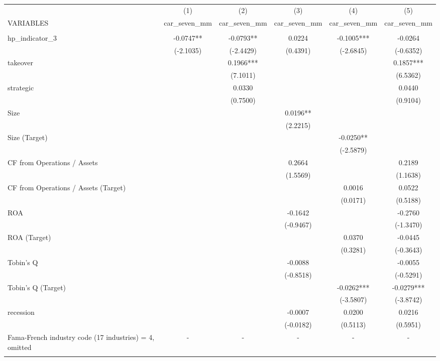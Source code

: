 \documentclass[12pt]{article}
\begin{document}
\begin{adjustbox}{max width=\textwidth}
   \begin{tabular}{lccccc} \hline
	& (1) & (2) & (3) & (4) & (5) \\
   VARIABLES & car\_seven\_mm & car\_seven\_mm & car\_seven\_mm & car\_seven\_mm & car\_seven\_mm \\ \hline
	&  &  &  &  &  \\
   hp\_indicator\_3 & -0.0747** & -0.0793** & 0.0224 & -0.1005*** & -0.0264 \\
	& (-2.1035) & (-2.4429) & (0.4391) & (-2.6845) & (-0.6352) \\
   takeover &  & 0.1966*** &  &  & 0.1857*** \\
	&  & (7.1011) &  &  & (6.5362) \\
   strategic &  & 0.0330 &  &  & 0.0440 \\
	&  & (0.7500) &  &  & (0.9104) \\
   Size &  &  & 0.0196** &  &  \\
	&  &  & (2.2215) &  &  \\
   Size (Target) &  &  &  & -0.0250** &  \\
	&  &  &  & (-2.5879) &  \\
   CF from Operations / Assets &  &  & 0.2664 &  & 0.2189 \\
	&  &  & (1.5569) &  & (1.1638) \\
   CF from Operations / Assets (Target) &  &  &  & 0.0016 & 0.0522 \\
	&  &  &  & (0.0171) & (0.5188) \\
   ROA &  &  & -0.1642 &  & -0.2760 \\
	&  &  & (-0.9467) &  & (-1.3470) \\
   ROA (Target) &  &  &  & 0.0370 & -0.0445 \\
	&  &  &  & (0.3281) & (-0.3643) \\
   Tobin's Q &  &  & -0.0088 &  & -0.0055 \\
	&  &  & (-0.8518) &  & (-0.5291) \\
   Tobin's Q (Target) &  &  &  & -0.0262*** & -0.0279*** \\
	&  &  &  & (-3.5807) & (-3.8742) \\
   recession &  &  & -0.0007 & 0.0200 & 0.0216 \\
	&  &  & (-0.0182) & (0.5113) & (0.5951) \\
   Fama-French industry code (17 industries) = 4, omitted & - & - & - & - & - \\
	&  &  &  &  &  \\

\end{tabular}
\end{adjustbox}
\end{document}
